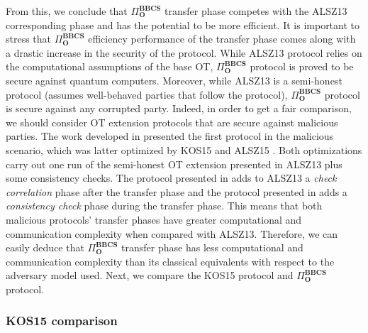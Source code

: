 

From this, we conclude that $\Pi^{\textbf{BBCS}}_{\textbf{O}}$ transfer phase competes with the ALSZ13 corresponding phase and has the potential to be more efficient. It is important to stress that $\Pi^{\textbf{BBCS}}_{\textbf{O}}$ efficiency performance of the transfer phase comes along with a drastic increase in the security of the protocol. While ALSZ13 protocol relies on the computational assumptions of the base OT, $\Pi^{\textbf{BBCS}}_{\textbf{O}}$ protocol is proved to be secure against quantum computers. Moreover, while ALSZ13 is a semi-honest protocol (assumes well-behaved parties that follow the protocol), $\Pi^{\textbf{BBCS}}_{\textbf{O}}$ protocol is secure against any corrupted party. Indeed, in order to get a fair comparison, we should consider OT extension protocols that are secure against malicious parties. The work developed in \cite{IKNP03} presented the first protocol in the malicious scenario, which was latter optimized by KOS15 \cite{KOS15} and ALSZ15 \cite{ALSZ15}. Both optimizations carry out one run of the semi-honest OT extension presented in ALSZ13 plus some consistency checks. The protocol presented in \cite{KOS15} adds to ALSZ13 a \textit{check correlation} phase after the transfer phase and the protocol presented in \cite{ALSZ15} adds a \textit{consistency check} phase during the transfer phase. This means that both malicious protocols' transfer phases have greater computational and communication complexity when compared with ALSZ13. Therefore, we can easily deduce that $\Pi^{\textbf{BBCS}}_{\textbf{O}}$ transfer phase has less computational and communication complexity than its classical equivalents with respect to the adversary model used. Next, we compare the KOS15 protocol \cite{KOS15} and $\Pi^{\textbf{BBCS}}_{\textbf{O}}$ protocol.


\subsubsection{KOS15 comparison}\label{Mal-Ext-OT_comp}

